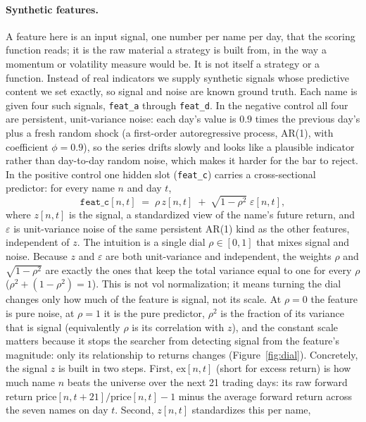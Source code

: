 \documentclass[11pt]{article}
\newcommand{\code}[1]{\texttt{#1}}
\begin{document}
\paragraph{Synthetic features.} A feature here is an input signal, one number per name per day, that the
scoring function reads; it is the raw material a strategy is built from, in the way a momentum or
volatility measure would be. It is not itself a strategy or a function. Instead of real indicators we
supply synthetic signals whose predictive content we set exactly, so signal and noise are known ground
truth. Each name is given four such signals, \code{feat\_a} through \code{feat\_d}. In the negative
control all four are persistent, unit-variance noise: each day's value is $0.9$ times the previous day's
plus a fresh random shock (a first-order autoregressive process, AR(1), with coefficient $\phi=0.9$), so
the series drifts slowly and looks like a plausible indicator rather than day-to-day random noise, which
makes it harder for the bar to reject. In the positive control one
hidden slot (\code{feat\_c}) carries a cross-sectional predictor: for every name $n$ and day $t$,
\begin{equation}
\code{feat\_c}[n,t] \;=\; \rho \, z[n,t] \;+\; \sqrt{1-\rho^{2}}\;\varepsilon[n,t],
\label{eq:synth}
\end{equation}
where $z[n,t]$ is the signal, a standardized view of the name's future return, and $\varepsilon$ is
unit-variance noise of the same persistent AR(1) kind as the other features, independent of $z$. The intuition is a single dial $\rho\in[0,1]$ that mixes signal and
noise. Because $z$ and $\varepsilon$ are both unit-variance and independent, the weights $\rho$ and
$\sqrt{1-\rho^{2}}$ are exactly the ones that keep the total variance equal to one for every $\rho$
($\rho^{2}+(1-\rho^{2})=1$). This is not vol normalization; it means turning the dial changes only how
much of the feature is signal, not its scale. At $\rho=0$ the feature is pure noise, at $\rho=1$ it is
the pure predictor, $\rho^{2}$ is the fraction of its variance that is signal (equivalently $\rho$ is its
correlation with $z$), and the constant scale matters because it stops the searcher from detecting signal
from the feature's magnitude: only its relationship to returns changes (Figure~\ref{fig:dial}).
Concretely, the signal $z$ is
built in two steps. First, $\mathrm{ex}[n,t]$ (short for excess return) is how much name $n$ beats the
universe over the next 21 trading days: its raw forward return $\mathrm{price}[n,t{+}21]/\mathrm{price}[n,t]-1$ minus the
average forward return across the seven names on day $t$. Second, $z[n,t]$ standardizes this per name,
\end{document}

